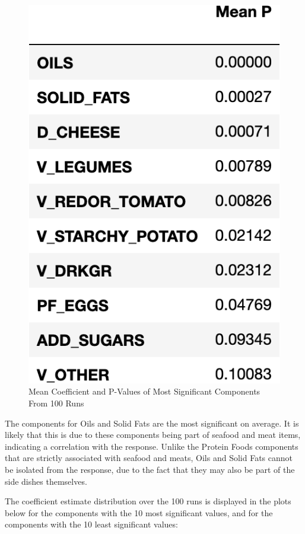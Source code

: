 \documentclass{article}
\begin{document}
\begin{figure}[htb]
\begin{minipage}[b]{0.48\linewidth}
  \centerline{\includegraphics[scale=0.3]{P_Value_Means_Top10.png}}
\end{minipage}
\caption{Mean Coefficient and P-Values of Most Significant Components From 100 Runs}
\label{fig:res}
\end{figure}

The components for Oils and Solid Fats are the most significant on average. It is likely that this is due to these components being part of seafood and meat items, indicating a correlation with the response. Unlike the Protein Foods components that are strictly associated with seafood and meats, Oils and Solid Fats cannot be isolated from the response, due to the fact that they may also be part of the side dishes themselves.

The coefficient estimate distribution over the 100 runs is displayed in the plots below for the components with the 10 most significant values, and for the components with the 10 least significant values:\\
\end{document}
